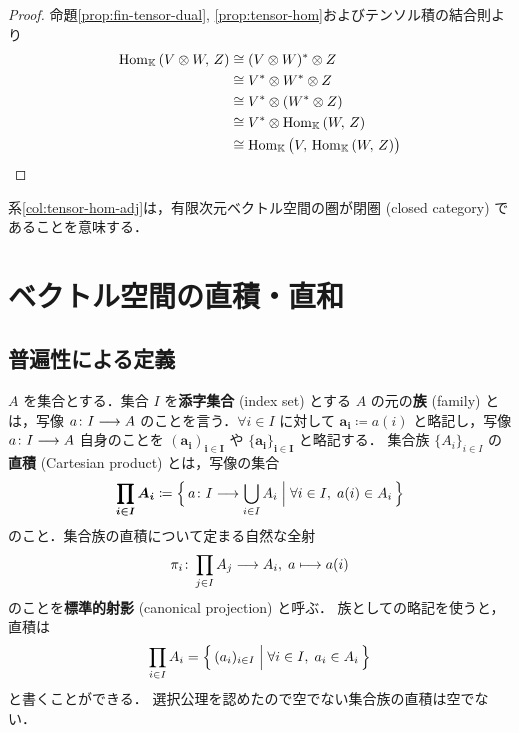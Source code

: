 \documentclass[rep_main]{subfiles}
\begin{document}
\begin{proof}
    命題\ref{prop:fin-tensor-dual}, \ref{prop:tensor-hom}およびテンソル積の結合則より
    \begin{align}
        \mathrm{Hom}_{\mathbb{K}} \mathop{} (V \otimes W,\, Z) 
        &\cong (V \otimes W)^* \otimes Z \\
        &\cong V^* \otimes W^* \otimes Z \\
        &\cong V^* \otimes (W^* \otimes Z) \\
        &\cong V^* \otimes \mathrm{Hom}_{\mathbb{K}} \mathop{} (W,\, Z) \\
        &\cong \mathrm{Hom}_{\mathbb{K}} \mathop{} \bigl( V,\, \mathrm{Hom}_{\mathbb{K}} \mathop{} (W,\, Z) \bigr) 
    \end{align}
\end{proof}

\begin{marker}
    系\ref{col:tensor-hom-adj}は，有限次元ベクトル空間の圏が閉圏 (closed category) であることを意味する．
\end{marker}


\section{ベクトル空間の直積・直和}

\subsection{普遍性による定義}

$A$ を集合とする．集合 $I$ を\textbf{添字集合} (index set) とする $A$ の元の\textbf{族} (family) とは，写像 $a \colon I \longrightarrow A$ のことを言う．$\forall i \in I$ に対して $\bm{a_i} \coloneqq a(i)$ と略記し，写像 $a \colon I \longrightarrow A$ 自身のことを $\bm{(a_i)_{i \in I}}$ や $\bm{\{a_i\}_{i \in I}}$ と略記する．
集合族 $\{A_i\}_{i \in I}$ の\textbf{直積} (Cartesian product) とは，写像の集合
\begin{align}
    \bm{\prod_{i \in I} A_i} \coloneqq \Bigl\{\, a \colon I \longrightarrow \bigcup_{i \in I} A_i \Bigm| \forall i \in I,\; a(i) \in A_i \,\Bigr\} 
\end{align}
のこと．集合族の直積について定まる自然な全射
\begin{align}
    \pi_i \colon \prod_{j \in I} A_j \longrightarrow A_i,\; a \longmapsto a(i)
\end{align}
のことを\textbf{標準的射影} (canonical projection) と呼ぶ．
族としての略記を使うと，直積は
\begin{align}
    \prod_{i \in I} A_i = \Bigl\{\, (a_i)_{i \in I} \Bigm| \forall i \in I,\; a_i \in A_i \,\Bigr\} 
\end{align}
と書くことができる．
選択公理を認めたので空でない集合族の直積は空でない．
\end{document}
